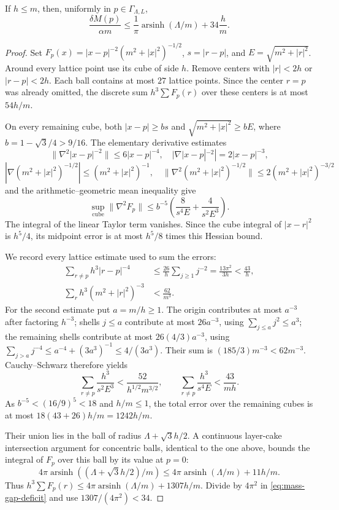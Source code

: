 \begin{lemma}
\label{lem:mass-gap-cubature}
If $h\le m$, then, uniformly in $p\in\Gamma_{\Lambda,L}$,
\begin{equation}
 \frac{\delta M(p)}{\alpha m}
 \le\frac1\pi\operatorname{arsinh}(\Lambda/m)+34\frac hm.
 \label{eq:mass-gap-cubature}
\end{equation}
\end{lemma}
\begin{proof}
Set $F_p(x)=|x-p|^{-2}(m^2+|x|^2)^{-1/2}$, $s=|r-p|$,
and $E=\sqrt{m^2+|r|^2}$. Around every lattice point use its cube of side
$h$. Remove centers with $|r|<2h$ or $|r-p|<2h$. Each ball contains at
most $27$ lattice points. Since the center $r=p$ was already omitted,
the discrete sum $h^3\sum F_p(r)$ over these centers is at most $54h/m$.

On every remaining cube, both $|x-p|\ge bs$ and
$\sqrt{m^2+|x|^2}\ge bE$, where $b=1-\sqrt3/4>9/16$.
The elementary derivative estimates
\[
 \|\nabla^2|x-p|^{-2}\|\le6|x-p|^{-4},\quad
 |\nabla|x-p|^{-2}|=2|x-p|^{-3},
\]
\[
 |\nabla(m^2+|x|^2)^{-1/2}|\le(m^2+|x|^2)^{-1},\quad
 \|\nabla^2(m^2+|x|^2)^{-1/2}\|
 \le2(m^2+|x|^2)^{-3/2}
\]
and the arithmetic--geometric mean inequality give
\[
 \sup_{\text{cube}}\|\nabla^2F_p\|
 \le b^{-5}\left(\frac8{s^4E}+\frac4{s^2E^3}\right).
\]
The integral of the linear Taylor term vanishes. Since the cube integral
of $|x-r|^2$ is $h^5/4$, its midpoint error is at most $h^5/8$ times this
Hessian bound.

We record every lattice estimate used to sum the errors:
\begin{align*}
 \sum_{r\ne p}h^3|r-p|^{-4}
 &\le\frac{26}{h}\sum_{j\ge1}j^{-2}
 =\frac{13\pi^2}{3h}<\frac{43}{h},\\
 \sum_rh^3(m^2+|r|^2)^{-3}&<\frac{62}{m^3}.
\end{align*}
For the second estimate put $a=m/h\ge1$. The origin contributes at most
$a^{-3}$ after factoring $h^{-3}$; shells $j\le a$ contribute at most
$26a^{-3}$, using $\sum_{j\le a}j^2\le a^3$; the remaining shells
contribute at most $26(4/3)a^{-3}$, using
$\sum_{j>a}j^{-4}\le a^{-4}+(3a^3)^{-1}\le4/(3a^3)$.
Their sum is $(185/3)m^{-3}<62m^{-3}$.
Cauchy--Schwarz therefore yields
\[
 \sum_{r\ne p}\frac{h^3}{s^2E^3}
 <\frac{52}{h^{1/2}m^{3/2}},\qquad
 \sum_{r\ne p}\frac{h^3}{s^4E}<\frac{43}{mh}.
\]
As $b^{-5}<(16/9)^5<18$ and $h/m\le1$, the total error over the remaining
cubes is at most $18(43+26)h/m=1242h/m$.

Their union lies in the ball of radius $\Lambda+\sqrt3h/2$. A continuous
layer-cake intersection argument for concentric balls, identical to the
one above, bounds the integral of $F_p$ over this ball by its value at
$p=0$:
\[
 4\pi\operatorname{arsinh}((\Lambda+\sqrt3h/2)/m)
 \le4\pi\operatorname{arsinh}(\Lambda/m)+11h/m.
\]
Thus $h^3\sum F_p(r)\le4\pi\operatorname{arsinh}(\Lambda/m)+1307h/m$.
Divide by $4\pi^2$ in \eqref{eq:mass-gap-deficit} and use
$1307/(4\pi^2)<34$.
\end{proof}

